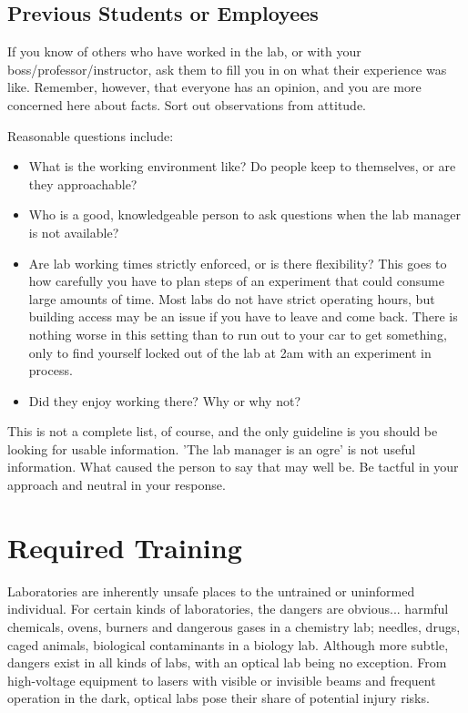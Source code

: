 \documentclass[11pt]{article}
\begin{document}
\subsection{Previous Students or Employees}

If you know of others who have worked in the lab, or with your boss/professor/instructor, ask them to fill you in on what their experience was like. Remember, however, that everyone has an opinion, and you are more concerned here about facts. Sort out observations from attitude. 

Reasonable questions include:

\begin{itemize}[noitemsep]
  \item What is the working environment like? Do people keep to themselves, or are they approachable? 
  \item Who is a good, knowledgeable person to ask questions when the lab manager is not available? 
  \item Are lab working times strictly enforced, or is there flexibility? This goes to how carefully you have to plan steps of an experiment that could consume large amounts of time. Most labs do not have strict operating hours, but building access may be an issue if you have to leave and come back. There is nothing worse in this setting than to run out to your car to get something, only to find yourself locked out of the lab at 2am with an experiment in process.
  \item Did they enjoy working there? Why or why not?
\end{itemize}

This is not a complete list, of course, and the only guideline is you should be looking for usable information. 'The lab manager is an ogre' is not useful information. What caused the person to say that may well be. Be tactful in your approach and neutral in your response.


\section{Required Training}
\label{sec:Training}

Laboratories are inherently unsafe places to the untrained or uninformed individual. For certain kinds of laboratories, the dangers are obvious... harmful chemicals, ovens, burners and dangerous gases in a chemistry lab; needles, drugs, caged animals, biological contaminants in a biology lab. Although more subtle, dangers exist in all kinds of labs, with an optical lab being no exception. From high-voltage equipment to lasers with visible or invisible beams and frequent operation in the dark, optical labs pose their share of potential injury risks.
\end{document}
